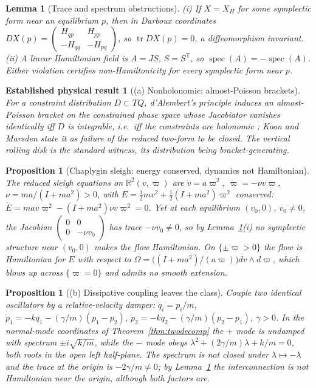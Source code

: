 \documentclass[12pt,a4paper]{article}
\theoremstyle{definition}
\theoremstyle{plain}
\newtheorem{lemma}[definition]{Lemma}
\newtheorem{proposition}[definition]{Proposition}
\theoremstyle{commentary}
\newtheorem{established}[definition]{Established physical result}
\newcommand{\R}{\mathbb{R}}
\begin{document}
\begin{lemma}[Trace and spectrum obstructions]\label{lem:trace}
(i) If $X=X_H$ for some symplectic form near an equilibrium $p$, then in Darboux coordinates
$DX(p)=\left(\begin{smallmatrix}H_{qp}&H_{pp}\\-H_{qq}&-H_{pq}\end{smallmatrix}\right)$, so
$\operatorname{tr}DX(p)=0$, a diffeomorphism invariant. (ii) A linear Hamiltonian field is
$A=JS$, $S=S^{\mathsf T}$, so $\operatorname{spec}(A)=-\operatorname{spec}(A)$. Either
violation certifies non-Hamiltonicity for \emph{every} symplectic form near $p$.
\end{lemma}

\begin{established}[(a) Nonholonomic: almost-Poisson brackets]\label{estab:nonholo}
For a constraint distribution $D\subset TQ$, d'Alembert's principle induces an
\emph{almost-Poisson} bracket on the constrained phase space whose Jacobiator vanishes
identically \emph{iff} $D$ is integrable, i.e.\ iff the constraints are holonomic
\cite{vanderSchaftMaschke1994,KoonMarsden1997}; Koon and Marsden state it as failure of the
reduced two-form to be closed. The vertical rolling disk is the standard witness, its
distribution being bracket-generating.
\end{established}

\begin{proposition}[Chaplygin sleigh: energy conserved, dynamics not Hamiltonian]
\label{prop:sleigh}
The reduced sleigh equations on $\R^{2}(v,\varpi)$ are $\dot v=a\varpi^{2}$,
$\dot\varpi=-\nu v\varpi$, $\nu=ma/(I+ma^{2})>0$, with
$E=\tfrac12 mv^{2}+\tfrac12(I+ma^{2})\varpi^{2}$ conserved:
$\dot E=mav\varpi^{2}-(I+ma^{2})\nu v\varpi^{2}=0$. Yet at each equilibrium $(v_0,0)$,
$v_0\neq0$, the Jacobian
$\left(\begin{smallmatrix}0&0\\0&-\nu v_0\end{smallmatrix}\right)$ has trace $-\nu v_0\ne0$,
so by Lemma~\ref{lem:trace}(i) no symplectic structure near $(v_0,0)$ makes the flow
Hamiltonian. On $\{\pm\varpi>0\}$ the flow \emph{is} Hamiltonian for $E$ with respect to
$\Omega=\bigl((I+ma^{2})/(a\varpi)\bigr)dv\wedge d\varpi$, which blows up across
$\{\varpi=0\}$ and admits no smooth extension.
\end{proposition}

\begin{proposition}[(b) Dissipative coupling leaves the class]\label{prop:damper}
Couple two identical oscillators by a relative-velocity damper: $\dot q_i=p_i/m$,
$\dot p_1=-kq_1-(\gamma/m)(p_1-p_2)$, $\dot p_2=-kq_2-(\gamma/m)(p_2-p_1)$, $\gamma>0$. In the
normal-mode coordinates of Theorem~\ref{thm:twodecomp} the $+$ mode is undamped with spectrum
$\pm i\sqrt{k/m}$, while the $-$ mode obeys $\lambda^{2}+(2\gamma/m)\lambda+k/m=0$, both roots
in the open left half-plane. The spectrum is not closed under $\lambda\mapsto-\lambda$ and the
trace at the origin is $-2\gamma/m\ne0$; by Lemma~\ref{lem:trace} the interconnection is not
Hamiltonian near the origin, although both factors are.
\end{proposition}
\end{document}
